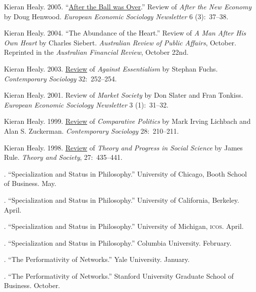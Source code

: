 \documentclass[11pt]{article}
\begin{document}
\ind  Kieran Healy. 2005. ``\href{http://www.kieranhealy.org/files/reviews/henwood.pdf}{After the Ball was Over}.'' Review of \emph{After the New
  Economy} by Doug Henwood. \emph{European Economic Sociology Newsletter} 6 (3):~37--38.

\ind  Kieran Healy. 2004. ``The Abundance of the Heart.'' Review of \emph{A Man After His Own Heart} by Charles
Siebert. \emph{Australian Review of Public Affairs}, October. Reprinted in the
\emph{Australian Financial Review}, October 22nd.

\ind  Kieran Healy. 2003. \href{http://links.jstor.org/sici?sici=0094-3061%28200303%2932%3A2%3C252%3AAEATOC%3E2.0.CO%3B2-F}{Review} of \emph{Against Essentialism} by Stephan Fuchs.
\emph{Contemporary Sociology} 32:~252--254.

\ind  Kieran Healy. 2001. Review of \emph{Market Society} by Don Slater and Fran Tonkiss. \emph{European
      Economic Sociology Newsletter} 3 (1):~31--32.


\ind  Kieran Healy. 1999. \href{http://links.jstor.org/sici?sici=0094-3061%28199903%2928%3A2%3C210%3ACPRCAS%3E2.0.CO%3B2-C}{Review} of \emph{Comparative Politics} by Mark Irving Lichbach and Alan S.
Zuckerman. \emph{Contemporary Sociology} 28:~210--211.


\ind  Kieran Healy. 1998. \href{http://www.kieranhealy.org/files/reviews/rule.pdf}{Review} of \emph{Theory and Progress in Social Science} by James Rule.  \emph{Theory
  and Society}, 27:~435--441.

 \bigskip

\medskip

. ``Specialization and Status in Philosophy.'' University of Chicago, Booth School of Business. May.

. ``Specialization and Status in Philosophy.'' University of California, Berkeley. April. 

. ``Specialization and Status in Philosophy.'' University of Michigan, \textsc{icos}. April.

. ``Specialization and Status in Philosophy.'' Columbia University. February. 

. ``The Performativity of Networks.'' Yale University. January.

. ``The Performativity of Networks.'' Stanford University Graduate School of Business. October. 
\end{document}
